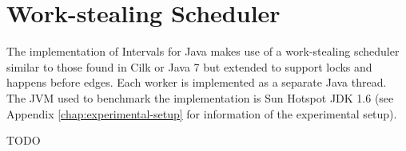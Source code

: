 
\chapter{Work-stealing Scheduler}
\label{chap:work-stealing-scheduler}

The implementation of Intervals for Java makes use of a work-stealing
scheduler similar to those found in Cilk \cite{Blumofe1995} or Java 7
\cite{Lea} but extended to support locks and happens before
edges. Each worker is implemented as a separate Java thread. The JVM
used to benchmark the implementation is Sun Hotspot JDK 1.6 (see
Appendix \ref{chap:experimental-setup} for information of the
experimental setup).

TODO

